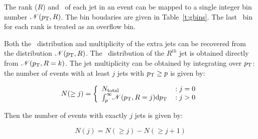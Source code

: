 The rank ($R$) and \pt\ of each jet in an event can be mapped to a single integer bin number ${\mathscr N}(p_{\text{T}},R)$. 
The bin boudaries are given in Table~\ref{t:gbins}.  The last \pt\ bin for each rank is treated as an overflow bin.  %

Both the \pt\ distribution and multiplicity of the extra jets can be recovered from the distribution ${\mathscr N}(p_{\text{T}},R)$. 
The \pt\ distribution of the $R^{th}$ jet is obtained directly from ${\mathscr N}(p_{\text{T}},R=k)$. 
The jet multiplicity can be obtained by integrating over $p_{\text{T}}$:
the number of events with at least $j$ jets with $p_{\text{T}} \geq p$ is given by:

\begin{equation}
N(\geq j) = \left\{
	\begin{array}{lr} 
	N_{\textrm{total}} & : j = 0 \\
	\int_{p}^{\infty} \! {\mathscr N}(p_{\text{T}}, R=j) \mathrm{d} p_{\text{T}} \, & : j > 0
	\end{array}
\right.
\label{eqn:inclmult}
\end{equation}

\noindent Then the number of events with exactly $j$ jets is given by:

\begin{equation}
N(j)=N(\geq j)-N(\geq j+1)
\label{eqn:exclmult}
\end{equation}

